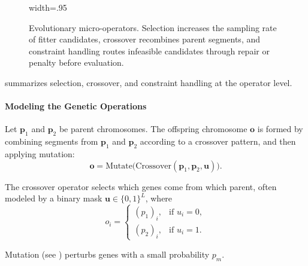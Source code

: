 \begin{figure}[t]
\begin{adjustbox}{width=.95\linewidth}
    \end{adjustbox}
    \caption{Evolutionary micro-operators. Selection increases the sampling rate of fitter candidates, crossover recombines parent segments, and constraint handling routes infeasible candidates through repair or penalty before evaluation.}
    \label{fig:lec11-ea-micro}
\end{figure}

 summarizes selection, crossover, and constraint handling at the operator level.

\paragraph{Modeling the Genetic Operations}

Let \(\mathbf{p}_1\) and \(\mathbf{p}_2\) be parent chromosomes. The offspring chromosome \(\mathbf{o}\) is formed by combining segments from \(\mathbf{p}_1\) and \(\mathbf{p}_2\) according to a crossover pattern, and then applying mutation:
\begin{equation}
    \mathbf{o} = \text{Mutate}\big(\text{Crossover}(\mathbf{p}_1, \mathbf{p}_2, \mathbf{u})\big).
    \label{eq:evo_offspring_from_parents}
\end{equation}

The crossover operator selects which genes come from which parent, often modeled by a binary mask \(\mathbf{u}\in\{0,1\}^L\), where
\begin{equation}
o_i = \begin{cases}
(p_1)_i, & \text{if } u_i = 0, \\
(p_2)_i, & \text{if } u_i = 1.
\end{cases}
\label{eq:ga_gene_selection_mask}
\end{equation}

Mutation (see ) perturbs genes with a small probability \(p_m\).

